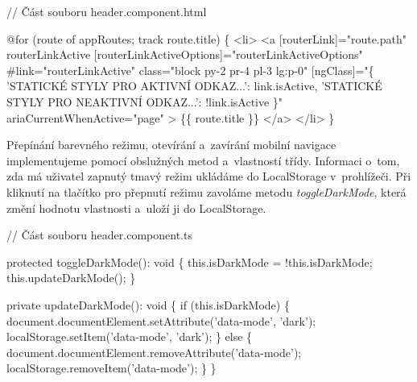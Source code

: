 \begin{prog}
// Část souboru header.component.html

@for (route of appRoutes; track route.title) \{
  <li>
    <a
      [routerLink]="route.path"
      routerLinkActive
      [routerLinkActiveOptions]="routerLinkActiveOptions"
      #link="routerLinkActive"
      class="block py-2 pr-4 pl-3 lg:p-0"
      [ngClass]="\{
        'STATICKÉ STYLY PRO AKTIVNÍ ODKAZ...': link.isActive,
        'STATICKÉ STYLY PRO NEAKTIVNÍ ODKAZ...': !link.isActive
      \}"
      ariaCurrentWhenActive="page"
    >
      \{\{ route.title \}\}
    </a>
  </li>
\}
\end{prog}

Přepínání barevného režimu, otevírání a~zavírání mobilní navigace implementujeme pomocí obslužných metod a~vlastností třídy. 
Informaci o~tom, zda má uživatel zapnutý tmavý režim ukládáme do LocalStorage v~prohlížeči. 
Při kliknutí na tlačítko pro přepnutí režimu zavoláme metodu \emph{toggleDarkMode}, která změní hodnotu vlastnosti a~uloží ji do LocalStorage.

\begin{prog}
// Část souboru header.component.ts

protected toggleDarkMode(): void \{
  this.isDarkMode = !this.isDarkMode;
  this.updateDarkMode();
\}

private updateDarkMode(): void \{
  if (this.isDarkMode) \{
    document.documentElement.setAttribute('data-mode', 'dark');
    localStorage.setItem('data-mode', 'dark');
  \} else \{
    document.documentElement.removeAttribute('data-mode');
    localStorage.removeItem('data-mode');
  \}
\}
\end{prog}